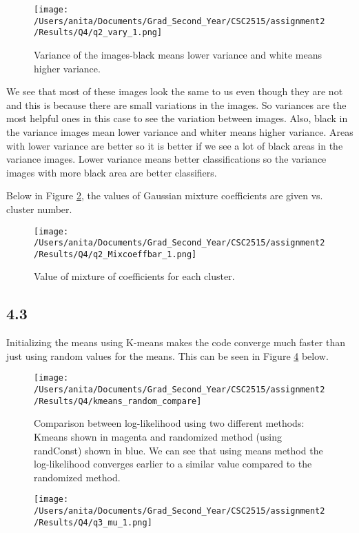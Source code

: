 \documentclass[10pt]{article}
\begin{document}
\begin{figure}[H]
	\centering
	\texttt{[image: /Users/anita/Documents/Grad\_Second\_Year/CSC2515/assignment2/Results/Q4/q2\_vary\_1.png]}
	\caption{Variance of the images-black means lower variance and white means higher variance.}
	\label{fig:q4.2_vary}
\end{figure}

We see that most of these images look the same to us even though they are not and this is because there are small variations in the images. So variances are the most helpful ones in this case to see the variation between images.
Also, black in the variance images mean lower variance and whiter means higher variance. Areas with lower variance are better so it is better if we see a lot of black areas in the variance images. Lower variance means better classifications so the variance images with more black area are better classifiers.

Below in Figure \ref{fig:q4.2_pik}, the values of Gaussian mixture coefficients are given vs. cluster number.
\begin{figure}[H]
	\centering
	\texttt{[image: /Users/anita/Documents/Grad\_Second\_Year/CSC2515/assignment2/Results/Q4/q2\_Mixcoeffbar\_1.png]}
	\caption{Value of mixture of coefficients for each cluster.}
	\label{fig:q4.2_pik}
\end{figure}


\subsection*{4.3}
Initializing the means using K-means makes the code converge much faster than just using random values for the means.
This can be seen in Figure \ref{fig:q4.3_mu} below.

\begin{figure}[H]
	\centering
	\texttt{[image: /Users/anita/Documents/Grad\_Second\_Year/CSC2515/assignment2/Results/Q4/kmeans\_random\_compare]}
	\caption{Comparison between log-likelihood using two different methods: Kmeans shown in magenta and randomized method (using randConst) shown in blue.
	We can see that using means method the log-likelihood converges earlier to a similar value compared to the randomized method.}
	\label{fig:q4.3_logL}
\end{figure}


\begin{figure}[H]
	\centering
	\texttt{[image: /Users/anita/Documents/Grad\_Second\_Year/CSC2515/assignment2/Results/Q4/q3\_mu\_1.png]}
	\caption{}
	\label{fig:q4.3_mu}
\end{figure}
\end{document}

